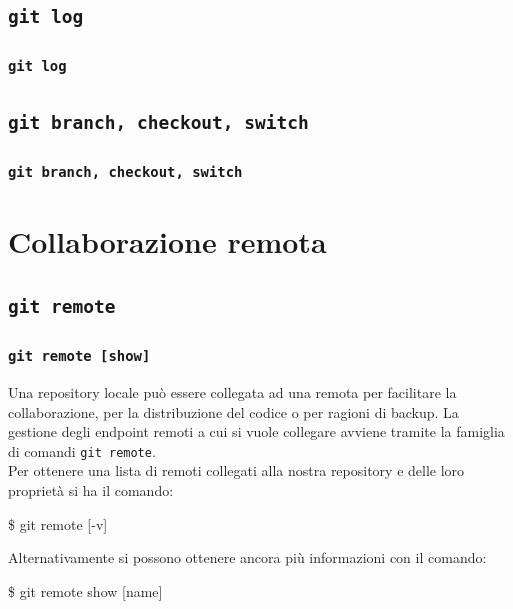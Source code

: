\documentclass{beamer}
\begin{document}
\subsection{\texttt{git log}}
\begin{frame}
  \frametitle{\texttt{git log}}
\end{frame}

\subsection{\texttt{git branch, checkout, switch}}
\begin{frame}
  \frametitle{\texttt{git branch, checkout, switch}}
\end{frame}

\section{Collaborazione remota}

\subsection{\texttt{git remote}}
\begin{frame}
  \frametitle{\texttt{git remote [show]}}
  Una repository locale pu\`o essere collegata ad una remota per facilitare la
  collaborazione, per la distribuzione del codice o per ragioni di backup.
  La gestione degli endpoint remoti a cui si vuole collegare avviene tramite la
  famiglia di comandi \texttt{git remote}. \\
  Per ottenere una lista di remoti collegati alla nostra repository e delle
  loro propriet\`a si ha il comando:
  \begin{semiverbatim}
  \$ git remote [-v]
  \end{semiverbatim}
  Alternativamente si possono ottenere ancora pi\`u informazioni con il comando:
  \begin{semiverbatim}
  \$ git remote show [name]
  \end{semiverbatim}
\end{frame}
\end{document}

